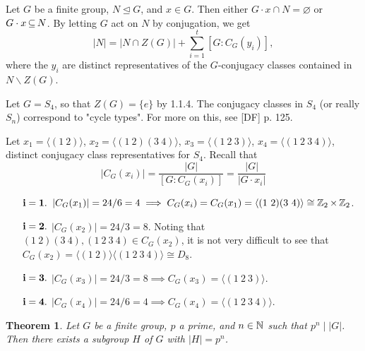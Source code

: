 \documentclass[11pt]{book}
\newcounter{counter}
\newtheorem{theorem}[counter]{Theorem}   \newtheorem*{theorem*}{Theorem}   \newtheorem{lemma}[counter]{Lemma}   \newtheorem{corollary}[counter]{Corollary}
\theoremstyle{definition}   \newtheorem{defn}[counter]{Definition} %
\newcommand{\bs}{\backslash}   \newcommand{\A}{\mathcal{A}}   \newcommand{\sy}{\textnormal{Syl}}   \newcommand{\size}[1]{\left| #1 \right|}
\newcommand{\nsg}{\mathrel{\unlhd}}   \newcommand{\ind}{\parindent24pt}   \newcommand{\vn}{\varnothing}
\newcommand{\gen}[1]{\langle #1 \rangle}   \newcommand{\stab}[2]{\tn{Stab}_{#1}(#2)}   \newcommand{\fix}[2]{\tn{Fix}_{#1}(#2)}
\newcommand{\vs}{\vspace{8pt}}
\numberwithin{counter}{chapter}
\begin{document}
\begin{modification}
Let $G$ be a finite group, $N\nsg G$, and $x \in G$. Then either $G\cdot x \cap N = \vn$ or $G\cdot x \operatorname{\subseteq} N$. By letting $G$ act on $N$ by conjugation, we get
	\[|N| = |N \cap Z(G)| + \sum_{i=1}^t [G : C_G(y_i)], \]
where the $y_i$ are distinct representatives of the $G$-conjugacy classes contained in $N\bs Z(G)$.
\end{modification}

\vs

\begin{example}
Let $G = S_4$, so that $Z(G) = \{e\}$ by 1.1.4. The conjugacy classes in $S_4$ (or really $S_n$) correspond to "cycle types". For more on this, see [DF] p. 125.

Let $x_1 = \gen{(1\ 2)}$, $x_2 = \gen{(1\ 2)(3\ 4)}$, $x_3 = \gen{(1\ 2\ 3)}$, $x_4 = \gen{(1\ 2\ 3\ 4)}$, distinct conjugacy class representatives for $S_4$. Recall that
	\[|C_G(x_i)| = \frac{|G|}{[G : C_G(x_i)]} = \frac{|G|}{|G \cdot x_i|} \]
	\begin{enumerate}
	\item[$\mathbf{i=1.}$ ] $|C_G(x_1)| = 24/6 = 4 \implies C_G(x_i) = C_G(x_1) = \gen{(1\ 2)(3\ 4)} \cong \z_2 \times \z_2$.
	\item[$\mathbf{i=2.}$ ] $|C_G(x_2)| = 24/3 = 8$. Noting that $(1\ 2)(3\ 4), (1\ 2\ 3\ 4) \in C_G(x_2)$, it is not very difficult to see that $C_G(x_2) = \gen{(1\ 2)}\gen{(1\ 2\ 3\ 4)} \cong D_8$.
	\item[$\mathbf{i=3.}$ ] $|C_G(x_3)| = 24/3 = 8 \implies C_G(x_3) = \gen{(1\ 2\ 3)}$.
	\item[$\mathbf{i=4.}$ ] $|C_G(x_4)| = 24/6 = 4 \implies C_G(x_4) = \gen{(1\ 2\ 3\ 4)}$.
	\end{enumerate}
\end{example}

\vs

\begin{theorem}
Let $G$ be a finite group, $p$ a prime, and $n\in \operatorname{\mathbb{N}}$ such that $p^n \mid |G|$. Then there exists a subgroup $H$ of $G$ with $|H| = p^n$.
\end{theorem}
\end{document}
